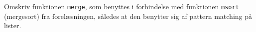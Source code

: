 Omskriv funktionen \lstinline{merge}, som benyttes i forbindelse med
funktionen \lstinline{msort} (mergesort) fra forelæsningen, således at
den benytter sig af pattern matching på lister.